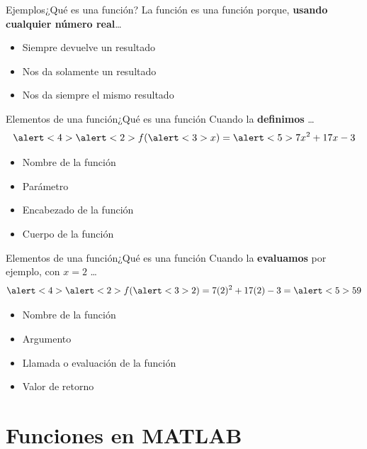 \documentclass[spanish, c, handout]{beamer}
\begin{document}
\begin{frame}{Ejemplos}{¿Qué es una función?}
    La función  es una función porque, \textbf{usando cualquier número real}\dots \pause

    \bigskip

    \begin{itemize}[<+->]
        \item Siempre devuelve un resultado
        \item Nos da solamente un resultado
        \item Nos da siempre el mismo resultado
    \end{itemize}
\end{frame}

\begin{frame}{Elementos de una función}{¿Qué es una función}
    Cuando la \textbf{definimos} \dots
$$\alert<4>{\alert<2>{f}(\alert<3>{x})} = \alert<5>{7x^2 + 17x - 3}$$ \pause

\begin{itemize}
    \item \alert<2>{Nombre de la función}
    \item \alert<3>{Parámetro}
    \item \alert<4>{Encabezado de la función}
    \item \alert<5>{Cuerpo de la función}    
\end{itemize}
\end{frame}

\begin{frame}{Elementos de una función}{¿Qué es una función}
    Cuando la \textbf{evaluamos} por ejemplo, con $x = 2$ \dots
$$\alert<4>{\alert<2>{f}(\alert<3>{2})} = 7(2)^2 + 17(2) - 3 = \alert<5>{59}$$ \pause

\begin{itemize}
    \item \alert<2>{Nombre de la función}
    \item \alert<3>{Argumento}
    \item \alert<4>{Llamada o evaluación de la función}
    \item \alert<5>{Valor de retorno}
\end{itemize}
\end{frame}

\section{Funciones en MATLAB}
\end{document}
